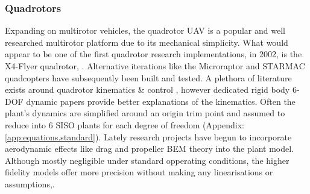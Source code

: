 \subsubsection*{Quadrotors}
Expanding on multirotor vehicles, the quadrotor UAV is a popular and well researched multirotor platform due to its mechanical simplicity. What would appear to be one of the first quadrotor research implementations, in 2002, is the X4-Flyer quadrotor, \cite{x4flyer,x4flyercontrol}. Alternative iterations like the Microraptor\cite{microraptor} and STARMAC\cite{starmac} quadcopters have subsequently been built and tested. A plethora of literature exists around quadrotor kinematics \& control \cite{dynamicmodelling2013, dynamicmodelling2009, modelingquadcopter, quaddynamics, fullquadcoptercontrol}, however dedicated rigid body 6-DOF dynamic papers \cite{rigidbodylecture,eulerrigidbody} provide better explanations of the kinematics. Often the plant's dynamics are simplified around an origin trim point and assumed to reduce into 6 SISO plants for each degree of freedom (Appendix:\ref{app:equations.standard}). Lately research projects have begun to incorporate aerodynamic effects like drag and propeller BEM theory into the plant model\cite{lowreynolds,bem,starmac}. Although mostly negligible under standard opperating conditions, the higher fidelity models offer more precision without making any linearisations or assumptions,\cite{nonlineardynamics,starmac}.
\par
